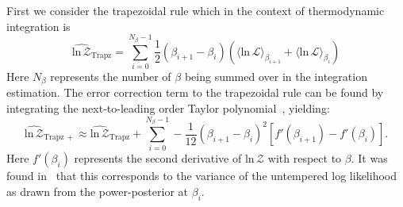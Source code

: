 First we consider the trapezoidal rule which in the context of thermodynamic integration is
\begin{equation}
    \widehat{\mathrm{ln} \, \mathcal{Z}}_{\mathrm{Trapz}} = \sum_{i=0}^{N_\beta-1} \frac{1}{2} \left(\beta_{i+1} - \beta_i \right) \left(\langle \mathrm{ln} \, \mathcal{L} \rangle_{\beta_{i+1}} + \langle \mathrm{ln} \, \mathcal{L} \rangle_{\beta_{i}} \right)
\end{equation}
Here $N_\beta$ represents the number of $\beta$ being summed over in the integration estimation. The error correction term to the trapezoidal rule can be found by integrating the next-to-leading order Taylor polynomial~\citep{abramowitz1965handbook}, yielding:
\begin{equation}
    \widehat{\mathrm{ln} \, \mathcal{Z}}_{\mathrm{Trapz \, +}} \approx \widehat{\mathrm{ln} \, \mathcal{Z}}_{\mathrm{Trapz}} + \sum_{i=0}^{N_\beta-1} -\frac{1}{12} \left(\beta_{i+1} - \beta_i \right)^2 \left[f'(\beta_{i+1}) - f'(\beta_{i}) \right].
\end{equation}
Here $f'(\beta_i)$ represents the second derivative of $\mathrm{ln} \, \mathcal{Z}$ with respect to $\beta$. It was found in~\cite{friel2014improving} that this corresponds to the variance of the untempered log likelihood as drawn from the power-posterior at $\beta_i$.

